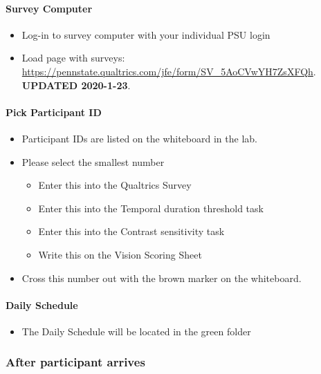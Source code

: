 \documentclass[]{article}
\providecommand{\tightlist}{%
  \setlength{\itemsep}{0pt}\setlength{\parskip}{0pt}}
\let\oldparagraph\paragraph
\renewcommand{\paragraph}[1]{\oldparagraph{#1}\mbox{}}
\begin{document}
\paragraph{Survey Computer}\label{survey-computer}

\begin{itemize}
\tightlist
\item
  Log-in to survey computer with your individual PSU login
\item
  Load page with surveys:
  \url{https://pennstate.qualtrics.com/jfe/form/SV_5AoCVwYH7ZsXFQh}.
  \textbf{UPDATED 2020-1-23}.
\end{itemize}

\paragraph{Pick Participant ID}\label{pick-participant-id}

\begin{itemize}
\tightlist
\item
  Participant IDs are listed on the whiteboard in the lab.
\item
  Please select the smallest number

  \begin{itemize}
  \tightlist
  \item
    Enter this into the Qualtrics Survey
  \item
    Enter this into the Temporal duration threshold task
  \item
    Enter this into the Contrast sensitivity task
  \item
    Write this on the Vision Scoring Sheet
  \end{itemize}
\item
  Cross this number out with the brown marker on the whiteboard.
\end{itemize}

\paragraph{Daily Schedule}\label{daily-schedule}

\begin{itemize}
\tightlist
\item
  The Daily Schedule will be located in the green folder
\end{itemize}

\subsubsection{After participant
arrives}\label{after-participant-arrives}
\end{document}
